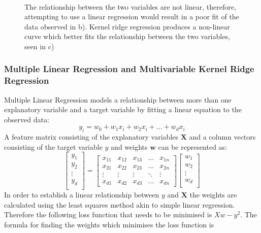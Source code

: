 \documentclass[a4paper,11pt,twoside]{article}
\begin{document}
\begin{figure} [h!]
{}\\
\caption{The relationship between the two variables are not linear, therefore, attempting to use a linear regression would result in a poor fit of the data observed in b). Kernel ridge regression produces a non-linear curve which better fits the relationship between the two variables, seen in c)}
\end{figure}

\subsubsection{Multiple Linear Regression and Multivariable Kernel Ridge Regression}

Multiple Linear Regression models a relationship between more than one explanatory variable and a target variable by fitting a linear equation to the observed data:
\begin{equation}
y_{i} = w_{0} + w_{1}x_{i} + w_{2}x_{i} +  ... + w_{d}x_{i}
\end{equation}
A feature matrix consisting of the explanatory variables $\textbf{X}$ and a column vectors consisting of the target variable $y$ and weights $\textbf{w}$ can be represented as:
\[
\begin{bmatrix}
	y_{1}\\
	y_{2}\\
	\vdots \\
	y_{d} \\
\end{bmatrix}
= \begin{bmatrix}
    x_{11} & x_{12} & x_{13} & \dots  & x_{1n} \\
    x_{21} & x_{22} & x_{23} & \dots  & x_{2n} \\
    \vdots & \vdots & \vdots & \ddots & \vdots \\
    x_{d1} & x_{d2} & x_{d3} & \dots  & x_{dn}
\end{bmatrix}
\begin{bmatrix}
	w_{1}\\
	w_{2}\\
	\vdots \\
	w_{d} \\
\end{bmatrix}
\]
In order to establish a linear relationship between $y$ and $\textbf{X}$ the weights are calculated using the least squares method akin to simple linear regression. Therefore the following loss function that needs to be minimised is $Xw -y^2$. The formula for finding the weights which minimises the loss function is
\end{document}
